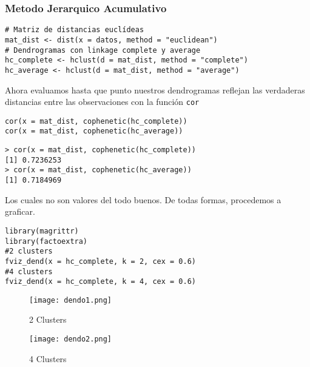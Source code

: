 \documentclass[b4paper]{article}
\begin{document}
    \subsubsection{Metodo Jerarquico Acumulativo}
    \begin{tcolorbox}
        \begin{verbatim}
# Matriz de distancias euclídeas
mat_dist <- dist(x = datos, method = "euclidean")
# Dendrogramas con linkage complete y average
hc_complete <- hclust(d = mat_dist, method = "complete")
hc_average <- hclust(d = mat_dist, method = "average")\end{verbatim}
    \end{tcolorbox}
    Ahora evaluamos hasta que punto nuestros dendrogramas reflejan las verdaderas
    distancias entre las observaciones con la funci\'on \verb|cor|
    \begin{minipage}{0.5\textwidth}
        \begin{tcolorbox}[title = input]
            \begin{verbatim}
cor(x = mat_dist, cophenetic(hc_complete))
cor(x = mat_dist, cophenetic(hc_average))\end{verbatim}
        \end{tcolorbox}
    \end{minipage}
    \begin{minipage}{0.5\textwidth}
        \begin{tcolorbox}[title = output]
            \begin{verbatim}
> cor(x = mat_dist, cophenetic(hc_complete))
[1] 0.7236253
> cor(x = mat_dist, cophenetic(hc_average))
[1] 0.7184969\end{verbatim}
        \end{tcolorbox}
    \end{minipage}
    Los cuales no son valores del todo buenos. De todas formas, procedemos a graficar.
    \begin{tcolorbox}[title = input]
        \begin{verbatim}
library(magrittr)
library(factoextra)
#2 clusters
fviz_dend(x = hc_complete, k = 2, cex = 0.6)
#4 clusters
fviz_dend(x = hc_complete, k = 4, cex = 0.6)\end{verbatim}
    \end{tcolorbox}
    \begin{figure}[h]
        \begin{minipage}[c]{0.5\textwidth}
            \centering
                \texttt{[image: dendo1.png]}
                \caption{2 Clusters}
        \end{minipage}
        \begin{minipage}[c]{0.5\textwidth}
            \centering
                \texttt{[image: dendo2.png]}
                \caption{4 Clusters}
        \end{minipage}
    \end{figure}
\end{document}
